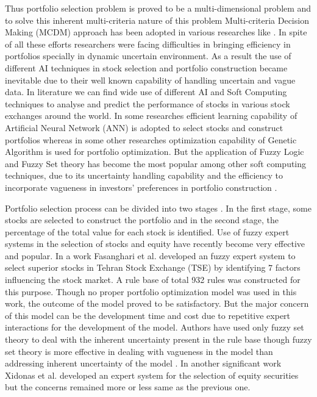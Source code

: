 \documentclass{elsarticle}
\begin{document}
Thus portfolio selection problem is proved to be a multi-dimensional problem and to solve this inherent multi-criteria nature of this problem Multi-criteria Decision Making (MCDM) approach has been adopted in various researches like \cite{ Xidonas2011, Edwards2007, Abdollahzadeh2002,Siskos1989}. In spite of all these efforts researchers were facing difficulties in bringing efficiency in portfolios specially in dynamic uncertain environment. As a result the use of different AI techniques in stock selection and portfolio construction became inevitable due to their well known capability of handling uncertain and vague data. In literature we can find wide use of different AI and Soft Computing techniques to analyse and predict the performance of stocks in various stock exchanges around the world. In some researches \cite{Adebiyi2012ANN, Fernandez2007ANN, Ko2008ANN, Olatunji2011ANN, De2011ANN} efficient learning capability of Artificial Neural Network (ANN) is adopted to select stocks and construct portfolios whereas in some other researches \cite{Chen2009GAa, Chang2009GA, Chen2009GAb, Jiao2007GA,Chen2010GA} optimization capability of Genetic Algorithm is used for portfolio optimization. But the application of Fuzzy Logic and Fuzzy Set theory has become the most popular among other soft computing techniques, due to its uncertainty handling capability and the efficiency to incorporate vagueness in investors' preferences in portfolio construction \cite{Bermudez2007fuzzy, Bilbao2006fuzzy, Fasanghari2010fuzzy, Huang2008fuzzy, Tiryaki2005fuzzy}. 

Portfolio selection process can be divided into two stages \cite{Xidonas2009}. In the first stage, some stocks are 
selected to construct the portfolio and in the second stage, the percentage of the total value for each stock is 
identified. Use of fuzzy expert systems in the selection of stocks and equity have recently become very effective and 
popular. In a work Fasanghari et al. \cite{Fasanghari2010fuzzy} developed an fuzzy expert system to select superior 
stocks in Tehran Stock Exchange (TSE) by identifying $7$ factors influencing the stock market. A rule base of total 932 
rules was constructed for this purpose. Though no proper portfolio optimization model was used in this work, the 
outcome of the model proved to be satisfactory. But the major concern of this model can be the development time and 
cost due to repetitive expert interactions for the development of the model. Authors have used only fuzzy set theory to 
deal with the inherent uncertainty present in the rule base though fuzzy set theory is more effective in dealing with 
vagueness in the model than addressing inherent uncertainty of the model \cite{Rodriguez2012hesitant}. In another 
significant work Xidonas et al.\cite{Xidonas2009} developed an expert system for the selection of equity securities but 
the concerns remained more or less same as the previous one.
\end{document}
